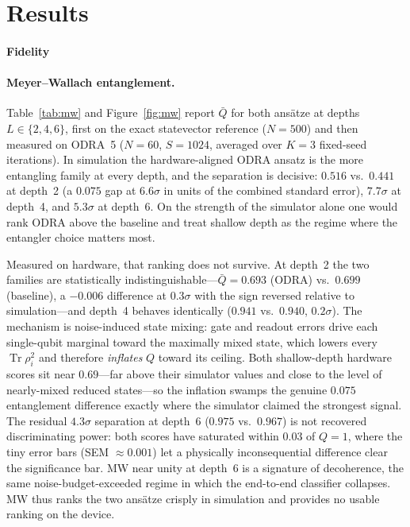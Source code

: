 \documentclass[letterpaper]{article} %
\begin{document}
\section{Results}
\paragraph{Fidelity}

\paragraph{Meyer--Wallach entanglement.}
Table~\ref{tab:mw} and Figure~\ref{fig:mw} report $\bar Q$ for both ans\"atze at
depths $L\in\{2,4,6\}$, first on the exact statevector reference ($N=500$) and
then measured on ODRA~5 ($N=60$, $S=1024$, averaged over $K=3$ fixed-seed
iterations). In simulation the hardware-aligned ODRA ansatz is the more
entangling family at every depth, and the separation is decisive: $0.516$ vs.\
$0.441$ at depth~2 (a $0.075$ gap at $6.6\sigma$ in units of the combined
standard error), $7.7\sigma$ at depth~4, and $5.3\sigma$ at depth~6. On the
strength of the simulator alone one would rank ODRA above the baseline and treat
shallow depth as the regime where the entangler choice matters most.

Measured on hardware, that ranking does not survive. At depth~2 the two families
are statistically indistinguishable---$\bar Q=0.693$ (ODRA) vs.\ $0.699$
(baseline), a $-0.006$ difference at $0.3\sigma$ with the sign reversed relative
to simulation---and depth~4 behaves identically ($0.941$ vs.\ $0.940$,
$0.2\sigma$). The mechanism is noise-induced state mixing: gate and readout
errors drive each single-qubit marginal toward the maximally mixed state, which
lowers every $\operatorname{Tr}\rho_i^{2}$ and therefore \emph{inflates} $Q$
toward its ceiling. Both shallow-depth hardware scores sit near $0.69$---far
above their simulator values and close to the level of nearly-mixed reduced
states---so the inflation swamps the genuine $0.075$ entanglement difference
exactly where the simulator claimed the strongest signal. The residual
$4.3\sigma$ separation at depth~6 ($0.975$ vs.\ $0.967$) is not recovered
discriminating power: both scores have saturated within $0.03$ of $Q=1$, where
the tiny error bars (SEM $\approx0.001$) let a physically inconsequential
difference clear the significance bar. MW near unity at depth~6 is a signature of
decoherence, the same noise-budget-exceeded regime in which the end-to-end
classifier collapses. MW thus ranks the two ans\"atze crisply in simulation and
provides no usable ranking on the device.
\end{document}
